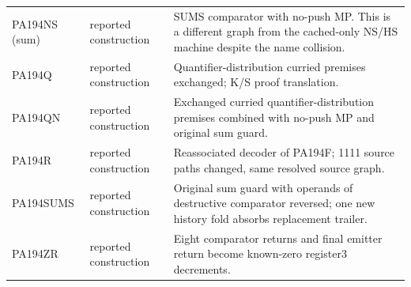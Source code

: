 \begin{longtable}{@{}p{.23\linewidth}p{.14\linewidth}p{.57\linewidth}@{}}
PA194NS (sum) & reported construction & SUMS comparator with no-push MP. This is a different graph from the cached-only NS/HS machine despite the name collision.\\
PA194Q & reported construction & Quantifier-distribution curried premises exchanged; K/S proof translation.\\
PA194QN & reported construction & Exchanged curried quantifier-distribution premises combined with no-push MP and original sum guard.\\
PA194R & reported construction & Reassociated decoder of PA194F; 1111 source paths changed, same resolved source graph.\\
PA194SUMS & reported construction & Original sum guard with operands of destructive comparator reversed; one new history fold absorbs replacement trailer.\\
PA194ZR & reported construction & Eight comparator returns and final emitter return become known-zero register3 decrements.\\
\bottomrule\end{longtable}

